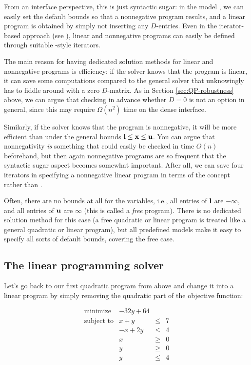 From an interface perspective, this is just syntactic sugar: in the 
model , we can easily set the default bounds 
so that a nonnegative program results, and a linear program is
obtained by simply not inserting any $D$-entries. Even in the
iterator-based approach (see 
), linear
and nonnegative programs can easily be defined through suitable 
-style iterators.

The main reason for having dedicated solution methods for linear and
nonnegative programs is efficiency: if the solver knows that the program
is linear, it can save some computations compared to the general solver
that unknowingly has to fiddle around with a zero $D$-matrix. As in
Section \ref{sec:QP-robustness} above, we can argue that checking in
advance whether $D=0$ is not an option in general, since this may require 
$\Omega(n^2)$ time on the dense interface.

Similarly, if the solver knows that the program is nonnegative, it
will be more efficient than under the general bounds 
$\mathbf{l}\leq \mathbf{x} \leq \mathbf{u}$.
You can argue that nonnegativity \emph{is} something that could easily
be checked in time $O(n)$ beforehand, but then again nonnegative
programs are so frequent that the syntactic sugar aspect becomes
somewhat important. After all, we can save four iterators in 
specifying a nonnegative linear program in terms of the concept 
 rather than 
.

Often, there are no bounds at all for the variables, i.e., all entries
of $\mathbf{l}$ are $-\infty$, and all entries of $\mathbf{u}$ 
are $\infty$ (this is
called a \emph{free} program). There is no dedicated solution method
for this case (a free quadratic or linear program is treated like a
general quadratic or linear program), but all predefined models make
it easy to specify all sorts of default bounds, covering the free 
case.

\subsection{The linear programming solver}
Let's go back to our first quadratic program from above and change it 
into a linear program by simply removing the quadratic part of the
objective function:

\[
\begin{array}{lrcl}
\mbox{minimize}       & - 32y + 64 \\
\mbox{subject to}     & x + y &\leq& 7 \\
                      & -x + 2y &\leq& 4 \\
                      & x &\geq& 0 \\
                      & y &\geq& 0 \\
                      & y &\leq& 4
\end{array}
\] 

